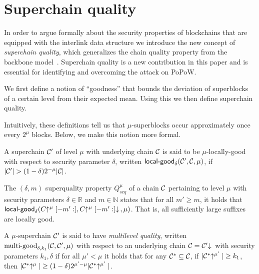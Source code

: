 \section{Superchain quality}
\label{sec.quality}

In order to argue formally about the security properties of blockchains that are
equipped with the interlink data structure we introduce the new concept of
{\em superchain quality}, which generalizes the chain quality property from the
backbone model~\cite{backbone}. Superchain quality is a new contribution in this
paper and is essential for identifying and overcoming the attack on PoPoW.

We first define a notion of ``goodness'' that bounds the deviation of
superblocks of a certain level from their expected mean. Using this we then
define superchain quality.

Intuitively, these definitions tell us that $\mu$-superblocks occur
approximately once every $2^\mu$ blocks. Below, we make this notion more formal.

\begin{definition}
A superchain $\mathcal{C}'$ of level
$\mu$ with underlying chain $\mathcal{C}$ is said to be $\mu$-\textnormal{locally-good}
with respect to security parameter $\delta$, written
$\textsf{local-good}_{\delta}(\mathcal{C}', \mathcal{C}, \mu)$, if $|\mathcal{C}'| > (1 -
\delta)2^{-\mu}|\mathcal{C}|$.
\end{definition}

\begin{definition}
The $(\delta, m)$ superquality property $Q^\mu_{scq}$ of a chain $\mathcal{C}$
pertaining to level $\mu$ with security parameters $\delta \in \mathbb{R}$ and
$m \in \mathbb{N}$ states that for all $m' \geq m$, it holds that
$\textsf{local-good}_{\delta}(C\negthickspace\uparrow^\mu[-m':],
C\negthickspace\uparrow^\mu[-m':]\negthickspace\downarrow\,, \mu)$. That is, all sufficiently large suffixes
are locally good.
\end{definition}

\begin{definition}
A $\mu$-superchain $\mathcal{C}'$ is said to have \textit{multilevel quality}, written
$\textnormal{multi-good}_{\delta, k_1}(\mathcal{C}, \mathcal{C}', \mu)$ with respect to an
underlying chain $\mathcal{C} = \mathcal{C}'\negthickspace\downarrow\,$ with security parameters $k_1,
\delta$ if for all $\mu' < \mu$ it holds that for any $\mathcal{C}^* \subseteq \mathcal{C}$,
if $|\mathcal{C}^*\negthickspace\uparrow^{\mu'}| \geq k_1$, then $|\mathcal{C}^*\negthickspace\uparrow^{\mu}| \geq (1 -
\delta)2^{\mu' - \mu}|\mathcal{C}^*\negthickspace\uparrow^{\mu'}|$.
\end{definition}

